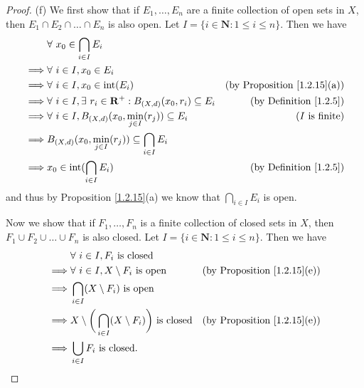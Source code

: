 \begin{proof}{(f)}
    We first show that if \(E_1, \dots, E_n\) are a finite collection of open sets in \(X\), then \(E_1 \cap E_2 \cap \dots \cap E_n\) is also open.
    Let \(I = \{i \in \mathbf{N} : 1 \leq i \leq n\}\).
    Then we have
    \begin{align*}
        & \forall\ x_0 \in \bigcap_{i \in I} E_i \\
        \implies & \forall\ i \in I, x_0 \in E_i \\
        \implies & \forall\ i \in I, x_0 \in \text{int}(E_i) & \text{(by Proposition \ref{1.2.15}(a))} \\
        \implies & \forall\ i \in I, \exists\ r_i \in \mathbf{R}^+ : B_{(X, d)}(x_0, r_i) \subseteq E_i & \text{(by Definition \ref{1.2.5})} \\
        \implies & \forall\ i \in I, B_{(X, d)}(x_0, \min_{j \in I}(r_j)) \subseteq E_i & \text{(\(I\) is finite)} \\
        \implies & B_{(X, d)}(x_0, \min_{j \in I}(r_j)) \subseteq \bigcap_{i \in I} E_i \\
        \implies & x_0 \in \text{int}(\bigcap_{i \in I} E_i) & \text{(by Definition \ref{1.2.5})}
    \end{align*}
    and thus by Proposition \ref{1.2.15}(a) we know that \(\bigcap_{i \in I} E_i\) is open.

    Now we show that if \(F_1, \dots, F_n\) is a finite collection of closed sets in \(X\), then \(F_1 \cup F_2 \cup \dots \cup F_n\) is also closed.
    Let \(I = \{i \in \mathbf{N} : 1 \leq i \leq n\}\).
    Then we have
    \begin{align*}
        & \forall\ i \in I, F_i \text{ is closed} \\
        \implies & \forall\ i \in I, X \setminus F_i \text{ is open} & \text{(by Proposition \ref{1.2.15}(e))} \\
        \implies & \bigcap_{i \in I} (X \setminus F_i) \text{ is open} \\
        \implies & X \setminus \bigg(\bigcap_{i \in I} (X \setminus F_i)\bigg) \text{ is closed} & \text{(by Proposition \ref{1.2.15}(e))} \\
        \implies & \bigcup_{i \in I} F_i \text{ is closed}.
    \end{align*}
\end{proof}

